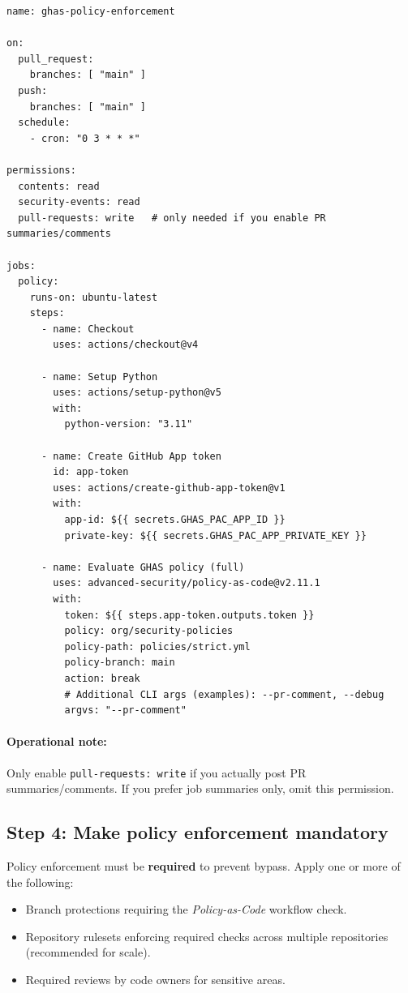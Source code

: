 \documentclass[11pt]{article}
\renewcommand{\cmd}[1]{\texttt{#1}}
\begin{document}
\begin{verbatim}
name: ghas-policy-enforcement

on:
  pull_request:
    branches: [ "main" ]
  push:
    branches: [ "main" ]
  schedule:
    - cron: "0 3 * * *"

permissions:
  contents: read
  security-events: read
  pull-requests: write   # only needed if you enable PR summaries/comments

jobs:
  policy:
    runs-on: ubuntu-latest
    steps:
      - name: Checkout
        uses: actions/checkout@v4

      - name: Setup Python
        uses: actions/setup-python@v5
        with:
          python-version: "3.11"

      - name: Create GitHub App token
        id: app-token
        uses: actions/create-github-app-token@v1
        with:
          app-id: ${{ secrets.GHAS_PAC_APP_ID }}
          private-key: ${{ secrets.GHAS_PAC_APP_PRIVATE_KEY }}

      - name: Evaluate GHAS policy (full)
        uses: advanced-security/policy-as-code@v2.11.1
        with:
          token: ${{ steps.app-token.outputs.token }}
          policy: org/security-policies
          policy-path: policies/strict.yml
          policy-branch: main
          action: break
          # Additional CLI args (examples): --pr-comment, --debug
          argvs: "--pr-comment"
\end{verbatim}

\paragraph{Operational note:} Only enable \cmd{pull-requests: write} if you actually post PR summaries/comments. If you prefer job summaries only, omit this permission.

\subsection{Step 4: Make policy enforcement mandatory}

Policy enforcement must be \textbf{required} to prevent bypass. Apply one or more of the following:
\begin{itemize}[leftmargin=*]
  \item Branch protections requiring the \textit{Policy-as-Code} workflow check.
  \item Repository rulesets enforcing required checks across multiple repositories (recommended for scale).
  \item Required reviews by code owners for sensitive areas.
\end{itemize}
\end{document}
